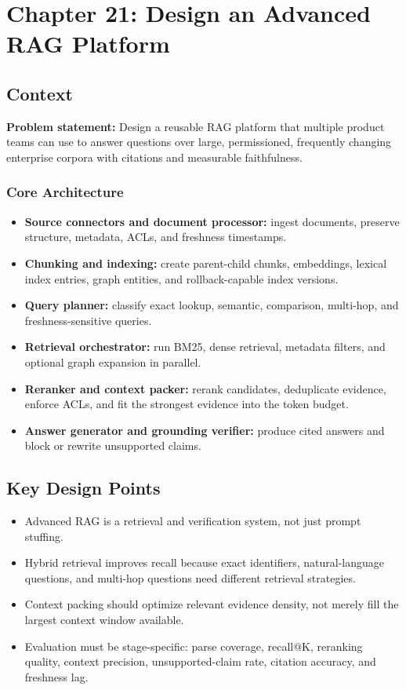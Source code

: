 \chapter{Chapter 21: Design an Advanced RAG Platform}

\section*{Context}
\textbf{Problem statement:} Design a reusable RAG platform that multiple product teams can use to answer questions over large, permissioned, frequently changing enterprise corpora with citations and measurable faithfulness.

\subsection*{Core Architecture}
\begin{itemize}
  \item \textbf{Source connectors and document processor:} ingest documents, preserve structure, metadata, ACLs, and freshness timestamps.
  \item \textbf{Chunking and indexing:} create parent-child chunks, embeddings, lexical index entries, graph entities, and rollback-capable index versions.
  \item \textbf{Query planner:} classify exact lookup, semantic, comparison, multi-hop, and freshness-sensitive queries.
  \item \textbf{Retrieval orchestrator:} run BM25, dense retrieval, metadata filters, and optional graph expansion in parallel.
  \item \textbf{Reranker and context packer:} rerank candidates, deduplicate evidence, enforce ACLs, and fit the strongest evidence into the token budget.
  \item \textbf{Answer generator and grounding verifier:} produce cited answers and block or rewrite unsupported claims.
\end{itemize}

\section*{Key Design Points}
\begin{itemize}
  \item Advanced RAG is a retrieval and verification system, not just prompt stuffing.
  \item Hybrid retrieval improves recall because exact identifiers, natural-language questions, and multi-hop questions need different retrieval strategies.
  \item Context packing should optimize relevant evidence density, not merely fill the largest context window available.
  \item Evaluation must be stage-specific: parse coverage, recall@K, reranking quality, context precision, unsupported-claim rate, citation accuracy, and freshness lag.
\end{itemize}

